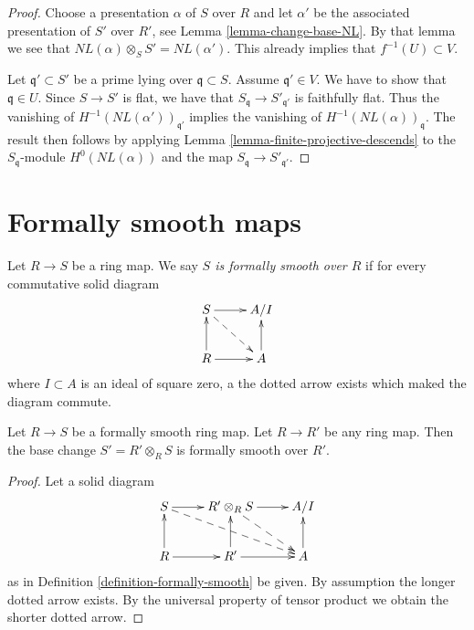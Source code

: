 \begin{proof}
Choose a presentation $\alpha$ of $S$ over $R$ and
let $\alpha'$ be the associated presentation of $S'$
over $R'$, see Lemma \ref{lemma-change-base-NL}.
By that lemma we see that
$NL(\alpha) \otimes_S S' = NL(\alpha')$.
This already implies that $f^{-1}(U) \subset V$.

\medskip\noindent
Let $\mathfrak q' \subset S'$ be a prime lying over
$\mathfrak q \subset S$. Assume $\mathfrak q' \in V$.
We have to show that $\mathfrak q \in U$.
Since $S \to S'$ is flat,
we have that $S_{\mathfrak q} \to S'_{\mathfrak q'}$
is faithfully flat. Thus the vanishing of
$H^{-1}(NL(\alpha'))_{\mathfrak q'}$ implies the
vanishing of $H^{-1}(NL(\alpha))_{\mathfrak q}$.
The result then follows by applying
Lemma \ref{lemma-finite-projective-descends}
to the $S_{\mathfrak q}$-module $H^0(NL(\alpha))$
and the map $S_{\mathfrak q} \to S'_{\mathfrak q'}$.
\end{proof}










\section{Formally smooth maps}
\label{section-formally-smooth}

\begin{definition}
\label{definition-formally-smooth}
Let $R \to S$ be a ring map.
We say {\it $S$ is formally smooth over $R$} if for every
commutative solid diagram
$$
\xymatrix{
S \ar[r] \ar@{-->}[rd] & A/I \\
R \ar[r] \ar[u] & A \ar[u]
}
$$
where $I \subset A$ is an ideal of square zero, a the dotted
arrow exists which maked the diagram commute.
\end{definition}

\begin{lemma}
\label{lemma-base-change-fs}
Let $R \to S$ be a formally smooth ring map.
Let $R \to R'$ be any ring map.
Then the base change $S' = R' \otimes_R S$ is formally smooth over $R'$.
\end{lemma}

\begin{proof}
Let a solid diagram
$$
\xymatrix{
S \ar[r] \ar@{-->}[rrd] & R' \otimes_R S \ar[r] \ar@{-->}[rd] & A/I \\
R  \ar[u] \ar[r] & R' \ar[r] \ar[u] & A \ar[u]
}
$$
as in Definition \ref{definition-formally-smooth} be given.
By assumption the longer dotted arrow exists. By the universal
property of tensor product we obtain the shorter dotted arrow.
\end{proof}

